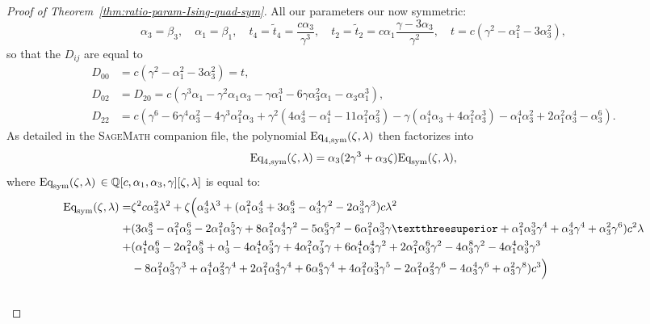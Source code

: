 \documentclass{scrartcl}
\newcommand{\Q}{\mathbb{Q}}
\begin{document}
\begin{proof}[Proof of Theorem~\ref{thm:ratio-param-Ising-quad-sym}]
All our parameters our now symmetric:
\[
\alpha_3 = \beta_3 , \quad \alpha_1 = \beta_1, \quad t_4 = \widetilde{t}_4 = \frac{c \alpha_3}{\gamma^3} , \quad t_2 = \widetilde{t}_2 = c\alpha_1\frac{\gamma - 3\alpha_3}{\gamma^2}, \quad t= c(\gamma^2-\alpha_1^2-3\alpha_3^2),
\]
so that the $D_{ij}$ are equal to
\begin{align*}
D_{00} &= c(\gamma^2 - \alpha_1^2 - 3\alpha_3^2) =t \nonumber, \\
D_{02} &= D_{20} = c(\gamma^3 \alpha_1  - \gamma^2 \alpha_1 \alpha_3 - \gamma \alpha_1^3 - 6 \gamma \alpha_3^2 \alpha_1 - \alpha_3 \alpha_1^3) \nonumber, \\
D_{22} &= c(\gamma^6 - 6\gamma^4\alpha_3^2 - 4\gamma^3\alpha_1^2\alpha_3 + \gamma^2(4\alpha_3^4 - \alpha_1^4 - 11\alpha_1^2\alpha_3^2) \nonumber - \gamma(\alpha_1^4\alpha_3 + 4\alpha_1^2\alpha_3^3) - \alpha_1^4\alpha_3^2 + 2\alpha_1^2\alpha_3^4 - \alpha_3^6).
\end{align*}
As detailed in the \textsc{SageMath} companion file, the polynomial $\textnormal{Eq}_{4,\textnormal{sym}}(\zeta,\lambda)$ then factorizes into
\[
\textnormal{Eq}_{4,\textnormal{sym}}(\zeta,\lambda)=\alpha_3(2\gamma^3+\alpha_3\zeta)\textnormal{Eq}_{\textnormal{sym}}(\zeta,\lambda),
\]
where $\textnormal{Eq}_{\textnormal{sym}}(\zeta,\lambda) \, \in \Q[c,\alpha_1,\alpha_3,\gamma][\zeta,\lambda]$ is equal to:
\begin{align}
\textnormal{Eq}_{\textnormal{sym}}(\zeta,\lambda)=&\zeta^2c\alpha_3^2\lambda^2+\zeta\Big(\alpha_3^4\lambda^3+(\alpha_1^2\alpha_3^4+3\alpha_3^6-\alpha_3^4\gamma^2-2\alpha_3^3\gamma^3)c\lambda^2 \nonumber\\ 
+&(3\alpha_3^8-\alpha_1^2\alpha_3^6-2\alpha_1^2\alpha_3^5\gamma+8\alpha_1^2\alpha_3^4\gamma^2-5\alpha_3^6\gamma^2-6\alpha_1^2\alpha_3^3\gamma³+\alpha_1^2\alpha_3^3\gamma^4+\alpha_3^4\gamma^4+\alpha_3^2\gamma^6)c^2\lambda \nonumber \\ \nonumber
+&(\alpha_1^4\alpha_3^6 - 2\alpha_1^2\alpha_3^8 + \alpha_3^1 - 4\alpha_1^4\alpha_3^5\gamma + 4\alpha_1^2\alpha_3^7\gamma + 6\alpha_1^4\alpha_3^4\gamma^2 + 2\alpha_1^2\alpha_3^6\gamma^2 - 4\alpha_3^8\gamma^2 - 4\alpha_1^4\alpha_3^3\gamma^3 \\ \nonumber
&- 8\alpha_1^2\alpha_3^5\gamma^3 + \alpha_1^4\alpha_3^2\gamma^4 + 2\alpha_1^2\alpha_3^4\gamma^4 + 6\alpha_3^6\gamma^4 + 4\alpha_1^2\alpha_3^3\gamma^5 - 2\alpha_1^2\alpha_3^2\gamma^6 - 4\alpha_3^4\gamma^6 + \alpha_3^2\gamma^8)c^3\Big)\\ \nonumber

\end{align}
\end{proof}
\end{document}
